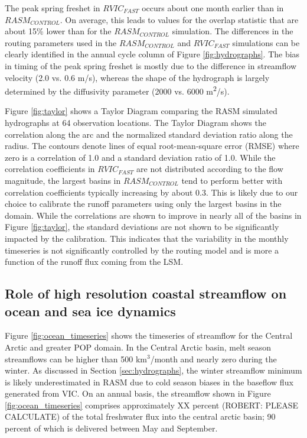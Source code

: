 \documentclass[jgrga, draft]{agutex}
\begin{document}
\begin{article}
The peak spring freshet in $RVIC_{FAST}$ occurs about one month earlier than in $RASM_{CONTROL}$.
On average, this leads to values for the overlap statistic that are about 15\% lower than for the $RASM_{CONTROL}$ simulation.
The differences in the routing parameters used in the $RASM_{CONTROL}$ and $RVIC_{FAST}$ simulations can be clearly identified in the annual cycle column of Figure \ref{fig:hydrographs}.
The bias in timing of the peak spring freshet is mostly due to the difference in streamflow velocity (2.0 vs. 0.6 m/s), whereas the shape of the hydrograph is largely determined by the diffusivity parameter (2000 vs. 6000 m\textsuperscript{2}/s).

Figure \ref{fig:taylor} shows a Taylor Diagram comparing the RASM simulated hydrographs at 64 observation locations.
The Taylor Diagram shows the correlation along the arc and the normalized standard deviation ratio along the radius.
The contours denote lines of equal root-mean-square error (RMSE) where zero is a correlation of 1.0 and a standard deviation ratio of 1.0.
While the correlation coefficients in $RVIC_{FAST}$ are not distributed according to the flow magnitude, the largest basins in $RASM_{CONTROL}$ tend to perform better with correlation coefficients typically increasing by about 0.3.
This is likely due to our choice to calibrate the runoff parameters using only the largest basins in the domain.
While the correlations are shown to improve in nearly all of the basins in Figure \ref{fig:taylor}, the standard deviations are not shown to be significantly impacted by the calibration.
This indicates that the variability in the monthly timeseries is not significantly controlled by the routing model and is more a function of the runoff flux coming from the LSM.

\subsection{Role of high resolution coastal streamflow on ocean and sea ice dynamics}
\label{sec:ocean}

Figure \ref{fig:ocean_timeseries} shows the timeseries of streamflow for the Central Arctic and greater POP domain.
In the Central Arctic basin, melt season streamflows can be higher than 500 km$^3$/month and nearly zero during the winter.
As discussed in Section \ref{sec:hydrographs}, the winter streamflow minimum is likely underestimated in RASM due to cold season biases in the baseflow flux generated from VIC.
On an annual basis, the streamflow shown in Figure \ref{fig:ocean_timeseries} comprises approximately XX percent (ROBERT: PLEASE CALCULATE) of the total freshwater flux into the central arctic basin; 90 percent of which is delivered between May and September.


\end{article}
\end{document}

